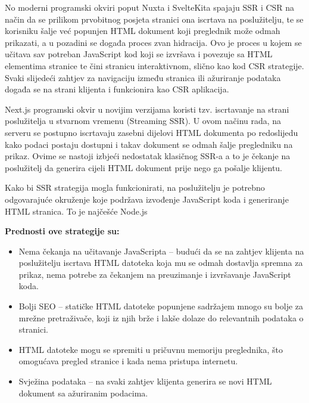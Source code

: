 \bigskip

No moderni programski okviri poput Nuxta i SvelteKita spajaju SSR i CSR na način da se prilikom prvobitnog posjeta stranici ona iscrtava na poslužitelju, te se korisniku šalje već popunjen HTML dokument koji preglednik može odmah prikazati, a u pozadini se događa proces zvan hidracija. Ovo je proces u kojem se učitava sav potreban JavaScript kod koji se izvršava i povezuje sa HTML elementima stranice te čini stranicu interaktivnom, slično kao kod CSR strategije. Svaki slijedeći zahtjev za navigaciju između stranica ili ažuriranje podataka događa se na strani klijenta i funkcionira kao CSR aplikacija.

\bigskip

Next.js programski okvir u novijim verzijama koristi tzv. iscrtavanje na strani poslužitelja u stvarnom vremenu (Streaming SSR). U ovom načinu rada, na serveru se postupno iscrtavaju zasebni dijelovi HTML dokumenta po redoslijedu kako podaci postaju dostupni i takav dokument se odmah šalje pregledniku na prikaz. Ovime se nastoji izbjeći nedostatak klasičnog SSR-a a to je čekanje na poslužitelj da generira cijeli HTML dokument prije nego ga pošalje klijentu.  \cite{nextjsloading}

\bigskip

Kako bi SSR strategija mogla funkcionirati, na poslužitelju je potrebno odgovarajuće okruženje koje podržava izvođenje JavaScript koda i generiranje HTML stranica. To je najčešće Node.js \cite{vuejsssr}

\bigskip

\textbf{Prednosti ove strategije su:}

\begin{itemize}
    \item Nema čekanja na učitavanje JavaScripta – budući da se na zahtjev klijenta na poslužitelju iscrtava HTML datoteka koja mu se odmah dostavlja spremna za prikaz, nema potrebe za čekanjem na preuzimanje i izvršavanje JavaScript koda.
    \item Bolji SEO – statičke HTML datoteke popunjene sadržajem mnogo su bolje za mrežne pretraživače, koji iz njih brže i lakše dolaze do relevantnih podataka o stranici.
    \item HTML datoteke mogu se spremiti u pričuvnu memoriju preglednika, što omogućava pregled stranice i kada nema pristupa internetu.
    \item Svježina podataka – na svaki zahtjev klijenta generira se novi HTML dokument sa ažuriranim podacima.
\end{itemize}


